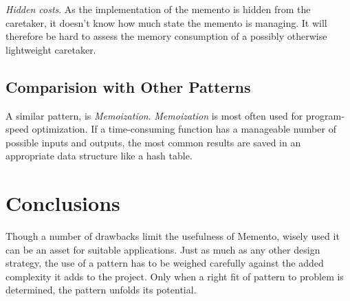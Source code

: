 \documentclass[11pt, a4paper, twoside]{article}
\begin{document}
	\noindent\emph{Hidden costs}. As the implementation of the memento is hidden from the caretaker, it doesn't know how much state the memento is managing. It will therefore be hard to assess the memory consumption of a possibly otherwise lightweight caretaker.
	
	\subsection{Comparision with Other Patterns}
	A similar pattern, is \emph{Memoization}. \emph{Memoization} is most often used for program-speed optimization. If a time-consuming function has a manageable number of possible inputs and outputs, the most common results are saved in an appropriate data structure like a hash table.
	
	\section{Conclusions}
	Though a number of drawbacks limit the usefulness of Memento, wisely used it can be an asset for suitable applications. Just as much as any other design strategy, the use of a pattern has to be weighed carefully against the added complexity it adds to the project. Only when a right fit of pattern to problem is determined, the pattern unfolds its potential.
	
	
	
\end{document}

